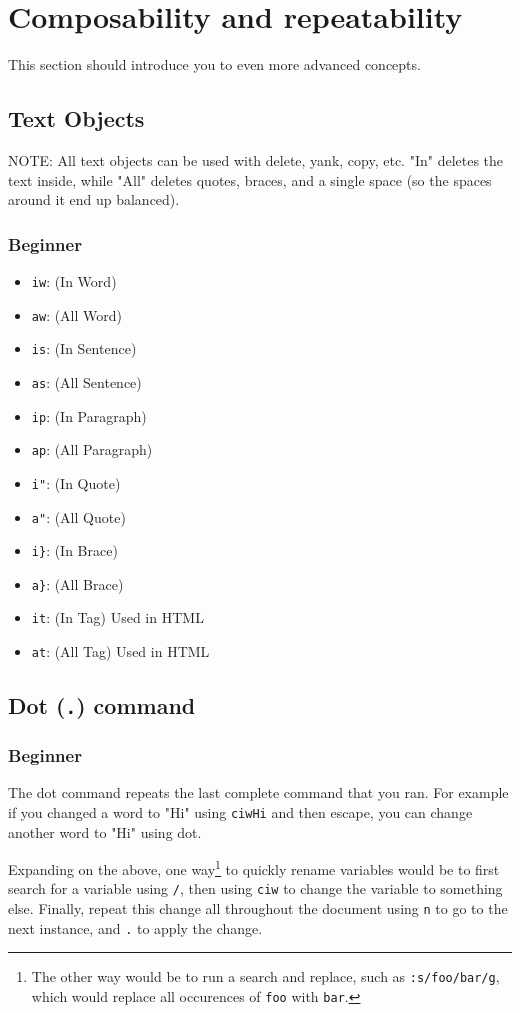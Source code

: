 \documentclass[11pt]{article}
\begin{document}
\section{Composability and repeatability}
\label{sec:org16f1444}
This section should introduce you to even more advanced concepts.
\subsection{Text Objects}
\label{sec:org4e8614b}
NOTE: All text objects can be used with delete, yank, copy, etc. "In" deletes
the text inside, while "All" deletes quotes, braces, and a single space (so the
spaces around it end up balanced).
\subsubsection{Beginner}
\label{sec:org1ba46dd}
\begin{itemize}
\item \texttt{iw}: (In Word)
\item \texttt{aw}: (All Word)
\item \texttt{is}: (In Sentence)
\item \texttt{as}: (All Sentence)
\item \texttt{ip}: (In Paragraph)
\item \texttt{ap}: (All Paragraph)
\item \texttt{i"}: (In Quote)
\item \texttt{a"}: (All Quote)
\item \texttt{i\}}: (In Brace)
\item \texttt{a\}}: (All Brace)
\item \texttt{it}: (In Tag) Used in HTML
\item \texttt{at}: (All Tag) Used in HTML
\end{itemize}
\subsection{Dot (\texttt{.}) command}
\label{sec:org8e352bc}
\subsubsection{Beginner}
\label{sec:orgf334179}
The dot command repeats the last complete command that you ran. For example if
you changed a word to "Hi" using \texttt{ciwHi} and then escape, you can change another
word to "Hi" using dot.

Expanding on the above, one way\footnote{The other way would be to run a search and replace, such as \texttt{:s/foo/bar/g}, which
would replace all occurences of \texttt{foo} with \texttt{bar}.} to quickly rename variables would be to
first search for a variable using \texttt{/}, then using \texttt{ciw} to change the variable
to something else. Finally, repeat this change all throughout the document using
\texttt{n} to go to the next instance, and \texttt{.} to apply the change.
\end{document}
